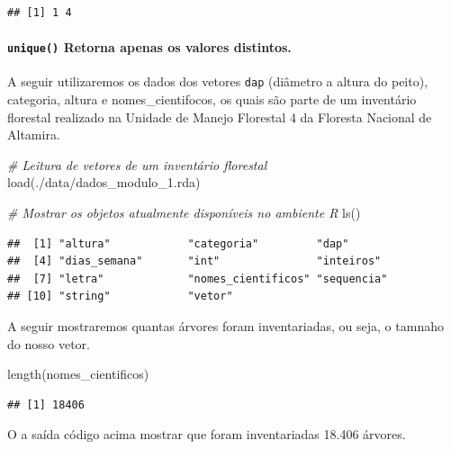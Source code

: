\documentclass[
]{article}
\newenvironment{Shaded}{\begin{snugshade}}{\end{snugshade}}
\newcommand{\CommentTok}[1]{\textcolor[rgb]{0.56,0.35,0.01}{\textit{#1}}}
\newcommand{\FunctionTok}[1]{\textcolor[rgb]{0.00,0.00,0.00}{#1}}
\newcommand{\NormalTok}[1]{#1}
\newcommand{\StringTok}[1]{\textcolor[rgb]{0.31,0.60,0.02}{#1}}
\begin{document}
\begin{verbatim}
## [1] 1 4
\end{verbatim}

\hypertarget{unique-retorna-apenas-os-valores-distintos.}{%
\paragraph{\texorpdfstring{\texttt{unique()} Retorna apenas os valores
distintos.}{unique() Retorna apenas os valores distintos.}}\label{unique-retorna-apenas-os-valores-distintos.}}

A seguir utilizaremos os dados dos vetores \texttt{dap} (diâmetro a
altura do peito), categoria, altura e nomes\_cientifocos, os quais são
parte de um inventário florestal realizado na Unidade de Manejo
Florestal 4 da Floresta Nacional de Altamira.

\begin{Shaded}
\begin{Highlighting}[]
\CommentTok{\# Leitura de vetores de um inventário florestal}
\FunctionTok{load}\NormalTok{(}\StringTok{\textquotesingle{}./data/dados\_modulo\_1.rda\textquotesingle{}}\NormalTok{)}

\CommentTok{\# Mostrar os objetos atualmente disponíveis no ambiente R}
\FunctionTok{ls}\NormalTok{()}
\end{Highlighting}
\end{Shaded}

\begin{verbatim}
##  [1] "altura"            "categoria"         "dap"              
##  [4] "dias_semana"       "int"               "inteiros"         
##  [7] "letra"             "nomes_cientificos" "sequencia"        
## [10] "string"            "vetor"
\end{verbatim}

A seguir mostraremos quantas árvores foram inventariadas, ou seja, o
tamnaho do nosso vetor.

\begin{Shaded}
\begin{Highlighting}[]
\FunctionTok{length}\NormalTok{(nomes\_cientificos)}
\end{Highlighting}
\end{Shaded}

\begin{verbatim}
## [1] 18406
\end{verbatim}

O a saída código acima mostrar que foram inventariadas 18.406 árvores.
\end{document}
